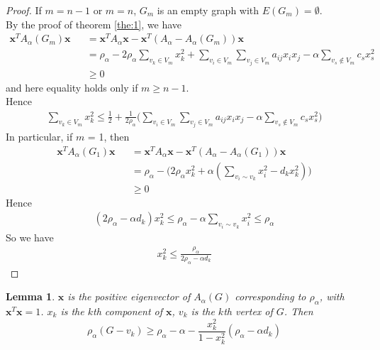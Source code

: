 \documentclass[amsthm]{elsart}
\newtheorem{lemma}{Lemma}[section]
\begin{document}
\begin{proof}
If $m = n - 1$ or $m = n$, $G_m$ is an empty graph with $E(G_m) = \emptyset$.
\\ By the proof of theorem \ref{the:1}, we have
\begin{eqnarray*}
\textbf{x}^T A_\alpha(G_m) \textbf{x}
&&= \textbf{x}^T A_\alpha \textbf{x} - \textbf{x}^T(A_\alpha - A_\alpha(G_m))\textbf{x}
\\ &&= \rho_\alpha
   - 2 \rho_\alpha \sum \limits_{v_k \in V_m}^{} x_k^2
   + \sum \limits_{v_i \in V_m}^{} \sum \limits_{v_j \in V_m}^{} a_{ij} x_i x_j
   - \alpha \sum \limits_{v_s \notin V_m}^{} c_s x_s^2
\\ &&\geqslant 0
\end{eqnarray*}
and here equality holds only if $m \geqslant n - 1$.
\\ Hence
\begin{eqnarray*}
\sum \limits_{v_k \in V_m}^{} x_k^2
\leqslant \frac{1}{2} + \frac{1}{2 \rho_\alpha} \Big( \sum \limits_{v_i \in V_m}^{} \sum \limits_{v_j \in V_m}^{} a_{ij} x_i x_j - \alpha \sum \limits_{v_s \notin V_m}^{} c_s x_s^2 \Big)
\end{eqnarray*}
In particular, if $m$ = 1, then
\begin{eqnarray*}
\textbf{x}^T A_\alpha(G_1) \textbf{x}
&&= \textbf{x}^T A_\alpha \textbf{x} - \textbf{x}^T(A_\alpha - A_\alpha(G_1))\textbf{x}
\\ &&= \rho_\alpha - \Big( 2 \rho_\alpha x_k^2 + \alpha (\sum \limits_{v_i \sim v_k}^{} x_i^2 - d_k x_k^2 )\Big)
\\ &&\geqslant 0
\end{eqnarray*}
Hence
\begin{eqnarray*}
(2 \rho_\alpha - \alpha d_k ) x_k^2
\leqslant \rho_\alpha - \alpha \sum \limits_{v_i \sim v_k}^{} x_i^2
\leqslant \rho_\alpha
\end{eqnarray*}
So we have
\begin{eqnarray*}
x_k^2 \leqslant \frac{\rho_\alpha} {2 \rho_\alpha - \alpha d_k}
\end{eqnarray*}
\end{proof}

\begin{lemma} \label{lem:2}
$\textbf{x}$ is the positive eigenvector of $A_\alpha (G)$ corresponding to $\rho _\alpha$, with $\textbf{x}^T \textbf{x} = 1$. $x_k$ is the $k$th component of $\textbf{x}$, $v_k$ is  the $k$th vertex of $G$. Then
\begin{equation} \label{equ:13}
\rho _\alpha (G - v_k)
    \geqslant \rho _\alpha - \alpha - \frac{x_k^2}{1 - x_k^2} (\rho _\alpha - \alpha d_k)
\end{equation}
\end{lemma}
\end{document}
